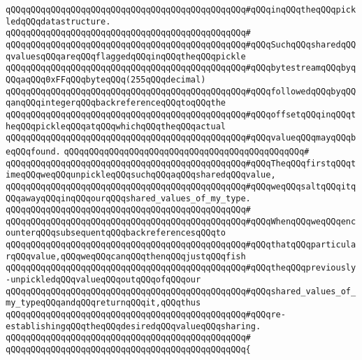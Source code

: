 \verb|qQQqqQQqqQQqqQQqqQQqqQQqqQQqqQQqqQQqqQQqqQQqqQQq#qQQqinqQQqtheqQQqpickledqQQqdatastructure.|\newline
\verb|qQQqqQQqqQQqqQQqqQQqqQQqqQQqqQQqqQQqqQQqqQQqqQQq#|\newline
\verb|qQQqqQQqqQQqqQQqqQQqqQQqqQQqqQQqqQQqqQQqqQQqqQQq#qQQqSuchqQQqsharedqQQqvaluesqQQqareqQQqflaggedqQQqinqQQqtheqQQqpickle|\newline
\verb|qQQqqQQqqQQqqQQqqQQqqQQqqQQqqQQqqQQqqQQqqQQqqQQq#qQQqbytestreamqQQqbyqQQqaqQQq0xFFqQQqbyteqQQq(255qQQqdecimal)|\newline
\verb|qQQqqQQqqQQqqQQqqQQqqQQqqQQqqQQqqQQqqQQqqQQqqQQq#qQQqfollowedqQQqbyqQQqanqQQqintegerqQQqbackreferenceqQQqtoqQQqthe|\newline
\verb|qQQqqQQqqQQqqQQqqQQqqQQqqQQqqQQqqQQqqQQqqQQqqQQq#qQQqoffsetqQQqinqQQqtheqQQqpickleqQQqatqQQqwhichqQQqtheqQQqactual|\newline
\verb|qQQqqQQqqQQqqQQqqQQqqQQqqQQqqQQqqQQqqQQqqQQqqQQq#qQQqvalueqQQqmayqQQqbeqQQqfound.|\newline
\verb|qQQqqQQqqQQqqQQqqQQqqQQqqQQqqQQqqQQqqQQqqQQqqQQq#|\newline
\verb|qQQqqQQqqQQqqQQqqQQqqQQqqQQqqQQqqQQqqQQqqQQqqQQq#qQQqTheqQQqfirstqQQqtimeqQQqweqQQqunpickleqQQqsuchqQQqaqQQqsharedqQQqvalue,|\newline
\verb|qQQqqQQqqQQqqQQqqQQqqQQqqQQqqQQqqQQqqQQqqQQqqQQq#qQQqweqQQqsaltqQQqitqQQqawayqQQqinqQQqourqQQqshared_values_of_my_type.|\newline
\verb|qQQqqQQqqQQqqQQqqQQqqQQqqQQqqQQqqQQqqQQqqQQqqQQq#|\newline
\verb|qQQqqQQqqQQqqQQqqQQqqQQqqQQqqQQqqQQqqQQqqQQqqQQq#qQQqWhenqQQqweqQQqencounterqQQqsubsequentqQQqbackreferencesqQQqto|\newline
\verb|qQQqqQQqqQQqqQQqqQQqqQQqqQQqqQQqqQQqqQQqqQQqqQQq#qQQqthatqQQqparticularqQQqvalue,qQQqweqQQqcanqQQqthenqQQqjustqQQqfish|\newline
\verb|qQQqqQQqqQQqqQQqqQQqqQQqqQQqqQQqqQQqqQQqqQQqqQQq#qQQqtheqQQqpreviously-unpickledqQQqvalueqQQqoutqQQqofqQQqour|\newline
\verb|qQQqqQQqqQQqqQQqqQQqqQQqqQQqqQQqqQQqqQQqqQQqqQQq#qQQqshared_values_of_my_typeqQQqandqQQqreturnqQQqit,qQQqthus|\newline
\verb|qQQqqQQqqQQqqQQqqQQqqQQqqQQqqQQqqQQqqQQqqQQqqQQq#qQQqre-establishingqQQqtheqQQqdesiredqQQqvalueqQQqsharing.|\newline
\verb|qQQqqQQqqQQqqQQqqQQqqQQqqQQqqQQqqQQqqQQqqQQqqQQq#|\newline
\verb|qQQqqQQqqQQqqQQqqQQqqQQqqQQqqQQqqQQqqQQqqQQqqQQq{|\newline
